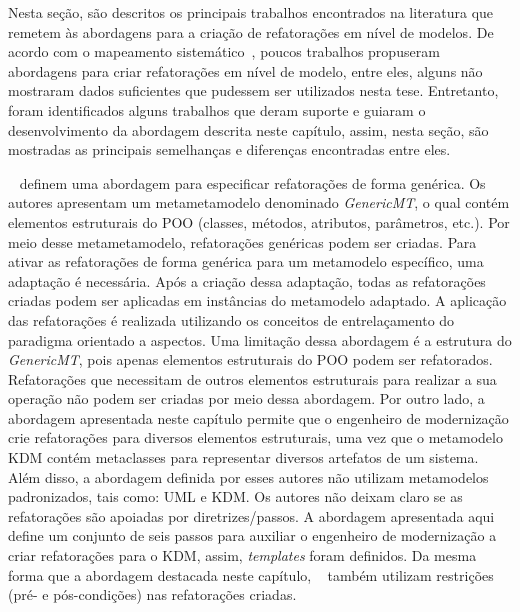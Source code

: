 Nesta seção, são descritos os principais trabalhos encontrados na literatura que remetem às abordagens para a criação de refatorações em nível de modelos. De acordo com o mapeamento sistemático~\cite{durelli_systematic_mapping}, poucos trabalhos propuseram abordagens para criar refatorações em nível de modelo, entre eles, alguns não mostraram dados suficientes que pudessem ser utilizados nesta tese. Entretanto, foram identificados alguns trabalhos que deram suporte e guiaram o desenvolvimento da abordagem descrita neste capítulo, assim, nesta seção, são mostradas as principais semelhanças e diferenças encontradas entre eles.

~ definem uma abordagem para especificar refatorações de forma genérica. Os autores apresentam um metametamodelo denominado \textit{GenericMT}, o qual contém elementos estruturais do POO (classes, métodos, atributos, parâmetros, etc.). Por meio desse metametamodelo, refatorações genéricas podem ser criadas. Para ativar as refatorações de forma genérica para um metamodelo específico, uma adaptação é necessária. Após a criação dessa adaptação, todas as refatorações criadas podem ser aplicadas em instâncias do metamodelo adaptado. A aplicação das refatorações é realizada utilizando os conceitos de entrelaçamento do paradigma orientado a aspectos. Uma limitação dessa abordagem é a estrutura do \textit{GenericMT}, pois apenas elementos estruturais do POO podem ser refatorados. Refatorações que necessitam de outros elementos estruturais para realizar a sua operação não podem ser criadas por meio dessa abordagem. Por outro lado, a abordagem apresentada neste capítulo permite que o engenheiro de modernização crie refatorações para diversos elementos estruturais, uma vez que o metamodelo KDM contém metaclasses para representar diversos artefatos de um sistema. Além disso, a abordagem definida por esses autores não utilizam metamodelos padronizados, tais como: UML e KDM. Os autores não deixam claro se as refatorações são apoiadas por diretrizes/passos. A abordagem apresentada aqui define um conjunto de seis passos para auxiliar o engenheiro de modernização a criar refatorações para o KDM, assim, \textit{templates} foram definidos. Da mesma forma que a abordagem destacada neste capítulo, ~ também utilizam restrições (pré- e pós-condições) nas refatorações criadas.

